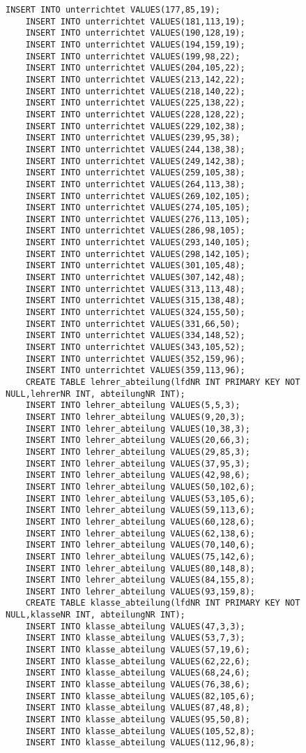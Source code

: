 \begin{lstlisting}[breaklines=True, numbers=none, basicstyle=\tiny, keepspaces=false]
	INSERT INTO unterrichtet VALUES(177,85,19);
	INSERT INTO unterrichtet VALUES(181,113,19);
	INSERT INTO unterrichtet VALUES(190,128,19);
	INSERT INTO unterrichtet VALUES(194,159,19);
	INSERT INTO unterrichtet VALUES(199,98,22);
	INSERT INTO unterrichtet VALUES(204,105,22);
	INSERT INTO unterrichtet VALUES(213,142,22);
	INSERT INTO unterrichtet VALUES(218,140,22);
	INSERT INTO unterrichtet VALUES(225,138,22);
	INSERT INTO unterrichtet VALUES(228,128,22);
	INSERT INTO unterrichtet VALUES(229,102,38);
	INSERT INTO unterrichtet VALUES(239,95,38);
	INSERT INTO unterrichtet VALUES(244,138,38);
	INSERT INTO unterrichtet VALUES(249,142,38);
	INSERT INTO unterrichtet VALUES(259,105,38);
	INSERT INTO unterrichtet VALUES(264,113,38);
	INSERT INTO unterrichtet VALUES(269,102,105);
	INSERT INTO unterrichtet VALUES(274,105,105);
	INSERT INTO unterrichtet VALUES(276,113,105);
	INSERT INTO unterrichtet VALUES(286,98,105);
	INSERT INTO unterrichtet VALUES(293,140,105);
	INSERT INTO unterrichtet VALUES(298,142,105);
	INSERT INTO unterrichtet VALUES(301,105,48);
	INSERT INTO unterrichtet VALUES(307,142,48);
	INSERT INTO unterrichtet VALUES(313,113,48);
	INSERT INTO unterrichtet VALUES(315,138,48);
	INSERT INTO unterrichtet VALUES(324,155,50);
	INSERT INTO unterrichtet VALUES(331,66,50);
	INSERT INTO unterrichtet VALUES(334,148,52);
	INSERT INTO unterrichtet VALUES(343,105,52);
	INSERT INTO unterrichtet VALUES(352,159,96);
	INSERT INTO unterrichtet VALUES(359,113,96);
	CREATE TABLE lehrer_abteilung(lfdNR INT PRIMARY KEY NOT NULL,lehrerNR INT, abteilungNR INT);
	INSERT INTO lehrer_abteilung VALUES(5,5,3);
	INSERT INTO lehrer_abteilung VALUES(9,20,3);
	INSERT INTO lehrer_abteilung VALUES(10,38,3);
	INSERT INTO lehrer_abteilung VALUES(20,66,3);
	INSERT INTO lehrer_abteilung VALUES(29,85,3);
	INSERT INTO lehrer_abteilung VALUES(37,95,3);
	INSERT INTO lehrer_abteilung VALUES(42,98,6);
	INSERT INTO lehrer_abteilung VALUES(50,102,6);
	INSERT INTO lehrer_abteilung VALUES(53,105,6);
	INSERT INTO lehrer_abteilung VALUES(59,113,6);
	INSERT INTO lehrer_abteilung VALUES(60,128,6);
	INSERT INTO lehrer_abteilung VALUES(62,138,6);
	INSERT INTO lehrer_abteilung VALUES(70,140,6);
	INSERT INTO lehrer_abteilung VALUES(75,142,6);
	INSERT INTO lehrer_abteilung VALUES(80,148,8);
	INSERT INTO lehrer_abteilung VALUES(84,155,8);
	INSERT INTO lehrer_abteilung VALUES(93,159,8);
	CREATE TABLE klasse_abteilung(lfdNR INT PRIMARY KEY NOT NULL,klasseNR INT, abteilungNR INT);
	INSERT INTO klasse_abteilung VALUES(47,3,3);
	INSERT INTO klasse_abteilung VALUES(53,7,3);
	INSERT INTO klasse_abteilung VALUES(57,19,6);
	INSERT INTO klasse_abteilung VALUES(62,22,6);
	INSERT INTO klasse_abteilung VALUES(68,24,6);
	INSERT INTO klasse_abteilung VALUES(76,38,6);
	INSERT INTO klasse_abteilung VALUES(82,105,6);
	INSERT INTO klasse_abteilung VALUES(87,48,8);
	INSERT INTO klasse_abteilung VALUES(95,50,8);
	INSERT INTO klasse_abteilung VALUES(105,52,8);
	INSERT INTO klasse_abteilung VALUES(112,96,8);
\end{lstlisting}
